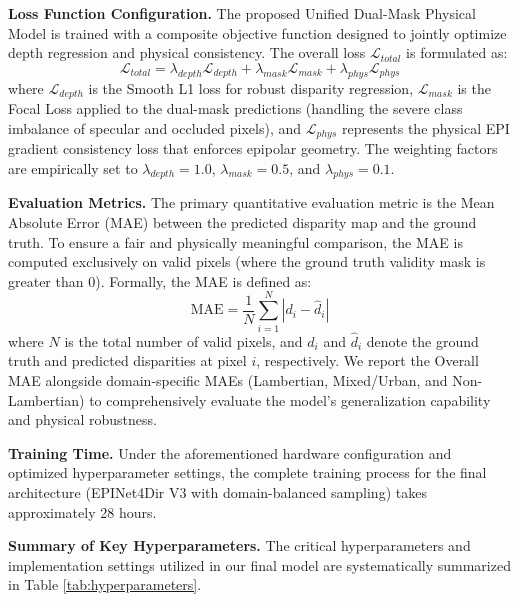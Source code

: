 \documentclass[lettersize,journal]{IEEEtran}
\begin{document}
\textbf{Loss Function Configuration.} 
The proposed Unified Dual-Mask Physical Model is trained with a composite objective function designed to jointly optimize depth regression and physical consistency. The overall loss $\mathcal{L}_{total}$ is formulated as:
\begin{equation}
\mathcal{L}_{total} = \lambda_{depth} \mathcal{L}_{depth} + \lambda_{mask} \mathcal{L}_{mask} + \lambda_{phys} \mathcal{L}_{phys}
\label{eq:ch4_1}
\end{equation}
where $\mathcal{L}_{depth}$ is the Smooth L1 loss for robust disparity regression, $\mathcal{L}_{mask}$ is the Focal Loss applied to the dual-mask predictions (handling the severe class imbalance of specular and occluded pixels), and $\mathcal{L}_{phys}$ represents the physical EPI gradient consistency loss that enforces epipolar geometry. The weighting factors are empirically set to $\lambda_{depth} = 1.0$, $\lambda_{mask} = 0.5$, and $\lambda_{phys} = 0.1$.

\textbf{Evaluation Metrics.} 
The primary quantitative evaluation metric is the Mean Absolute Error (MAE) between the predicted disparity map and the ground truth. To ensure a fair and physically meaningful comparison, the MAE is computed exclusively on valid pixels (where the ground truth validity mask is greater than 0). Formally, the MAE is defined as:
\begin{equation}
\text{MAE} = \frac{1}{N} \sum_{i=1}^{N} |d_i - \hat{d}_i|
\label{eq:ch4_2}
\end{equation}
where $N$ is the total number of valid pixels, and $d_i$ and $\hat{d}_i$ denote the ground truth and predicted disparities at pixel $i$, respectively. We report the Overall MAE alongside domain-specific MAEs (Lambertian, Mixed/Urban, and Non-Lambertian) to comprehensively evaluate the model's generalization capability and physical robustness.

\textbf{Training Time.} 
Under the aforementioned hardware configuration and optimized hyperparameter settings, the complete training process for the final architecture (EPINet4Dir V3 with domain-balanced sampling) takes approximately 28 hours.

\textbf{Summary of Key Hyperparameters.}
The critical hyperparameters and implementation settings utilized in our final model are systematically summarized in Table \ref{tab:hyperparameters}.
\end{document}
